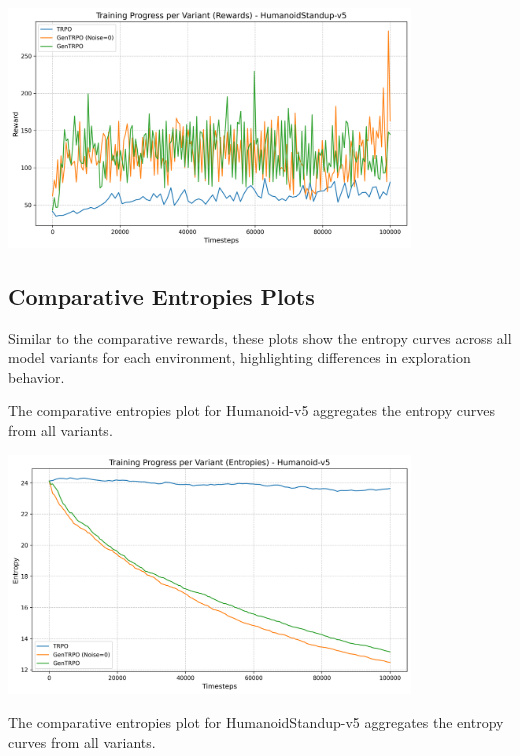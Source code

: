 \documentclass{svproc}
\begin{document}
\begin{center}
\includegraphics[width=0.8\textwidth]{graph_rewards_HumanoidStandup-v5.png}
\end{center}

\subsection{Comparative Entropies Plots}
Similar to the comparative rewards, these plots show the entropy curves across all model variants for each environment, highlighting differences in exploration behavior.

The comparative entropies plot for Humanoid-v5 aggregates the entropy curves from all variants.

\begin{center}
\includegraphics[width=0.8\textwidth]{graph_entropies_Humanoid-v5.png}
\end{center}

The comparative entropies plot for HumanoidStandup-v5 aggregates the entropy curves from all variants.
\end{document}
